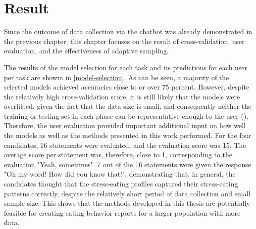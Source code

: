 
\chapter{Result}\label{chapter:result}
Since the outcome of data collection via the chatbot was already demonstrated in the previous chapter, this chapter focuses on the result of cross-validation, user evaluation, and the effectiveness of adaptive sampling.

The results of the model selection for each task and its predictions for each user per task are showin in \autoref{model-selection}. As can be seen, a majority of the selected models achieved accuracies close to or over 75 percent. However, despite the relatively high cross-validation score, it is still likely that the models were overfitted, given the fact that the data size is small, and consequently neither the training or testing set in each phase can be representative enough to the user (\cite{45_overfitting}). Therefore, the user evaluation provided important additional input on how well the models as well as the methods presented in this work performed. For the four candidates, 16 statements were evaluated, and the evaluation score was 15. The average score per statement was, therefore, close to 1, corresponding to the evaluation "Yeah, sometimes". 7 out of the 16 statements were given the response "Oh my word! How did you know that!", demonstrating that, in general, the candidates thought that the stress-eating profiles captured their stress-eating patterns correctly, despite the relatively short period of data collection and small sample size. This shows that the methods developed in this thesis are potentially feasible for creating eating behavior reports for a larger population with more data.\bigskip

